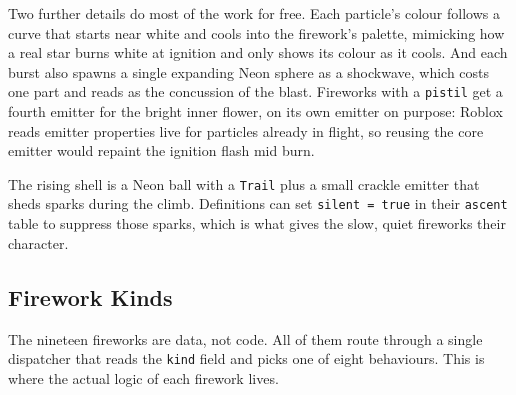 \documentclass[12pt,letterpaper]{article}
\begin{document}
Two further details do most of the work for free. Each particle's colour follows a curve that starts near white and cools into the firework's palette, mimicking how a real star burns white at ignition and only shows its colour as it cools. And each burst also spawns a single expanding Neon sphere as a shockwave, which costs one part and reads as the concussion of the blast. Fireworks with a \texttt{pistil} get a fourth emitter for the bright inner flower, on its own emitter on purpose: Roblox reads emitter properties live for particles already in flight, so reusing the core emitter would repaint the ignition flash mid burn.

The rising shell is a Neon ball with a \texttt{Trail} plus a small crackle emitter that sheds sparks during the climb. Definitions can set \texttt{silent = true} in their \texttt{ascent} table to suppress those sparks, which is what gives the slow, quiet fireworks their character.

\subsection{Firework Kinds}

The nineteen fireworks are data, not code. All of them route through a single dispatcher that reads the \texttt{kind} field and picks one of eight behaviours. This is where the actual logic of each firework lives.
\end{document}
